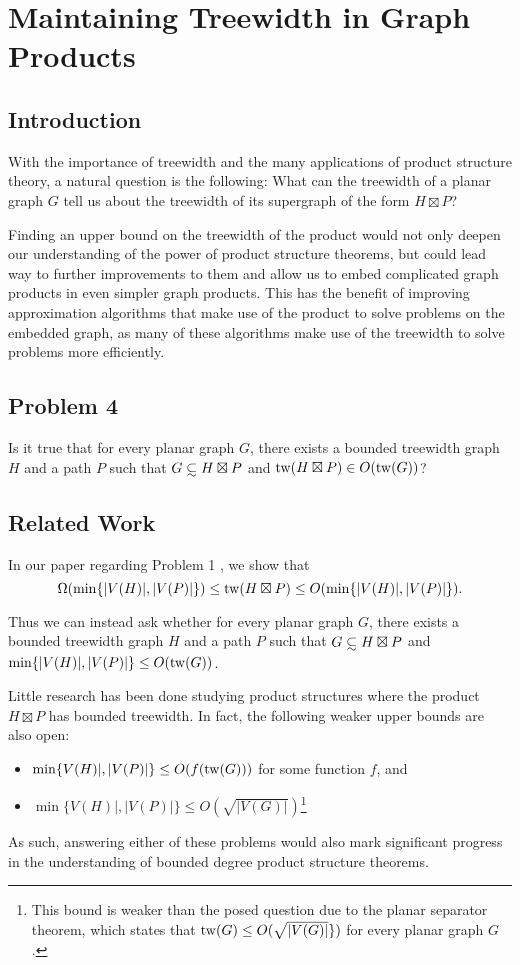 \documentclass[../main.tex]{subfiles}
\begin{document}
	
	\section{Maintaining Treewidth in Graph Products}
	\subsection{Introduction}
	With the importance of treewidth and the many applications of product structure theory, a natural question is the following: What can the treewidth of a planar graph $G$ tell us about the treewidth of its supergraph of the form $H\boxtimes P$?
	
	Finding an upper bound on the treewidth of the product would not only deepen our understanding of the power of product structure theorems, but could lead way to further improvements to them and allow us to embed complicated graph products in even simpler graph products. This has the benefit of improving approximation algorithms 
	that make use of the product to solve problems on the embedded graph, as many of these algorithms make use of the treewidth to solve problems more efficiently. 
	\subsection{Problem 4}
	  Is it true that for every planar graph $G$, there exists a bounded treewidth graph $H$ and a path $P$ such that $G \subsetsim H\boxtimes P$ and $\operatorname{tw}(H\boxtimes P) \in O(\operatorname{tw}(G))$? 
	
	\subsection{Related Work}
	In our paper regarding Problem 1 \cite[Lemma~3, Equation~(2)]{DMWW24}, we show that $$\Omega(\min\{|V(H)|,|V(P)|\})\leq  \operatorname{tw}( H\boxtimes P) \leq O(\min\{|V(H)|,|V(P)|\}).$$ 
	
	Thus we can instead ask whether for every planar graph $G$, there exists a bounded treewidth graph $H$ and a path $P$ such that $G\subsetsim H\boxtimes P$ and $\min\{|V(H)|,|V(P)|\} \leq O(\operatorname{tw}(G))$. 
	
	Little research has been done studying product structures where the  product $H\boxtimes P$ has bounded treewidth. In fact, the following weaker upper bounds are also open:
	\begin{itemize}
	\item$\min\{V(H)|,|V(P)|\} \leq O(f(\operatorname{tw}(G)))$ for some function $f$, and
	\item $\min\{V(H)|,|V(P)|\} \leq O(\sqrt{|V(G)|})$\footnote{This bound is weaker than the posed question due to the planar separator theorem\cite{LT79}, which states that $\operatorname{tw}(G) \le O(\sqrt{|V(G)|}\})$ for every planar graph $G$.}
	\end{itemize} 
	As such, answering either of these problems would also mark significant progress in the understanding of bounded degree product structure theorems.
	
\end{document}

